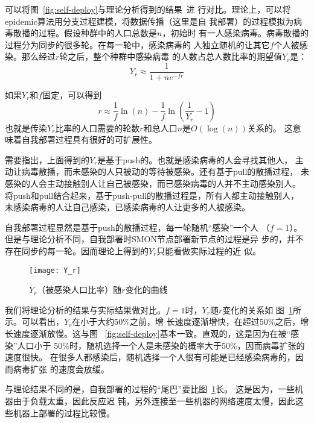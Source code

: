 可以将图~\ref{fig:self-deploy}与理论分析得到的结果~\cite{Bailey1975}进
行对比。理论上，可以将epidemic算法用分支过程建模，将数据传播（这里是自
我部署）的过程模拟为病毒散播的过程。假设种群中的人口总数是$n$，初始时
有一人感染病毒。病毒散播的过程分为同步的很多轮。在每一轮中，感染病毒的
人独立随机的让其它$f$个人被感染。那么经过$r$轮之后，整个种群中感染病毒
的人数占总人数比率的期望值$Y_r$是：\begin{equation*} Y_r \approx
\frac{1}{1+ne^{-fr}} \end{equation*}

如果$Y_r$和$f$固定，可以得到
\begin{equation*}
r \approx \frac{1}{f} \ln(n) - \frac{1}{f} \ln(\frac{1}{Y_r} - 1)
\end{equation*}
也就是传染$Y_r$比率的人口需要的轮数$r$和总人口$n$是$O(\log(n))$关系的。
这意味着自我部署过程具有很好的可扩展性。

需要指出，上面得到的$Y_r$是基于push的。也就是感染病毒的人会寻找其他人，
主动让病毒散播，而未感染的人只被动的等待被感染。还有基于pull的散播过程，
未感染的人会主动接触别人让自己被感染，而已感染病毒的人并不主动感染别人。
将push和pull结合起来，基于push-pull的散播过程是，所有人都主动接触别人，
未感染病毒的人让自己感染，已感染病毒的人让更多的人被感染。

自我部署过程显然是基于push的散播过程，每一轮随机“感染”一个人
（$f=1$）。但是与理论分析不同，自我部署时SMON节点部署新节点的过程是异
步的，并不存在同步的每一轮。因而理论上得到的$Y_r$只能看做实际过程的近
似。

\begin{figure}
\centering
  \begin{minipage}{0.8\linewidth}
    \centering
    \texttt{[image: Y\_r]}
    \caption{$Y_r$（被感染人口比率）随$r$变化的曲线}
    \label{fig:self-deploy_Yr}
  \end{minipage}
\end{figure}


我们将理论分析的结果与实际结果做对比。$f=1$时，$Y_r$随$r$变化的关系如
图~\ref{fig:self-deploy_Yr}所示。可以看出，$Y_r$在小于大约50\%之前，增
长速度逐渐增快，在超过50\%之后，增长速度逐渐放慢。这与图~
\ref{fig:self-deploy}基本一致。直观的，这是因为在被“感染”人口小于
50\%时，随机选择一个人是未感染的概率大于50\%，因而病毒扩张的速度很快。
在很多人都感染后，随机选择一个人很有可能是已经感染病毒的，因而病毒扩张
的速度会放缓。

与理论结果不同的是，自我部署的过程的“尾巴”要比图~\ref{fig:self-deploy_Yr}长。
这是因为，一些机器由于负载太重，因此反应迟
钝，另外连接至一些机器的网络速度太慢，因此这些机器上部署的过程比较慢。



